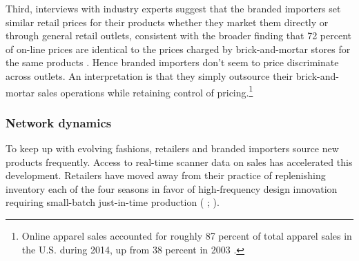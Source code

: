 \documentclass[12pt]{article} \usepackage{amsmath,amssymb,amsthm,geometry,graphicx,setspace,algorithm,algpseudocode,float}
\newcommand{\quotes}[1]{``#1''}
\begin{document}
Third, interviews with industry experts suggest that the branded importers
set similar retail prices for their products whether they market them
directly or through general retail outlets, consistent with the
broader finding that 72 percent of on-line prices are identical to the
prices charged by brick-and-mortar stores for the same products %
\citep{cavallo2016}. Hence branded importers don't seem to
price discriminate across outlets.  An interpretation is that they simply outsource their brick-and-mortar sales operations while
retaining control of pricing.\footnote{%
Online apparel sales accounted for roughly 87 percent of total apparel sales in the U.S. during 2014, up from 38 percent in 2003 \citep{statista_online}. \medskip}  


\subsubsection{Network dynamics}
\label{subsec:network_dynamics}
To keep up with evolving fashions, retailers and branded importers source new products frequently.  Access to real-time
scanner data on sales has accelerated this development. Retailers have moved away from their practice of replenishing inventory each of the four seasons in favor of high-frequency design innovation requiring small-batch just-in-time production (%
\citet{mcfarlan2012}; \citet{taplin2014}).
\end{document}
